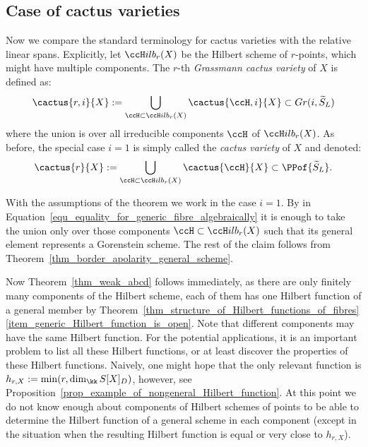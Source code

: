 \documentclass[12pt,a4paper]{article}
\newcommand{\usualHilb}{{\ccH}ilb}
\begin{document}
\subsection{Case of cactus varieties}

Now we compare the standard terminology for cactus varieties with the relative linear spans.
Explicitly, let $\usualHilb_{r}(X)$ be the Hilbert scheme of $r$-points, which might have multiple components.
The $r$-th \emph{Grassmann cactus variety} of $X$ is defined as:
\[
  \cactus{r, i}{X}:= \bigcup_{\ccH \subset \usualHilb_{r}(X)} \cactus{\ccH, i}{X}  \subset Gr(i, \widetilde{S}_L)
\]
where the union is over all irreducible components $\ccH$ of $\usualHilb_{r}(X)$.
As before, the special case $i=1$ is simply called the \emph{cactus variety} of $X$ and denoted:
\begin{equation}
  \label{equ_defin_cactus}
  \cactus{r}{X}:= \bigcup_{\ccH \subset \usualHilb_{r}(X)} \cactus{\ccH}{X}  \subset \PPof{\widetilde{S}_L}.
\end{equation}




\begin{prf}
   With the assumptions of the theorem we work in the case
   $i=1$.
   By \cite[Cor.~6.20]{jabu_jelisiejew_finite_schemes_and_secants}
    in Equation~\ref{equ_equality_for_generic_fibre_algebraically} it is enough to take the union only over those components $\ccH \subset \usualHilb_{r}(X)$ such that its general element represents a Gorenstein scheme.
    The rest of the claim follows from Theorem~\ref{thm_border_apolarity_general_scheme}.
\end{prf}

Now Theorem~\ref{thm_weak_abcd} follows immediately, as there are only finitely many components of the Hilbert scheme, each of them has one Hilbert function of a general member by Theorem~\ref{thm_structure_of_Hilbert_functions_of_fibres}\ref{item_generic_Hilbert_function_is_open}.
Note that different components may have the same Hilbert function.
For the potential applications, it is an important problem to list all these Hilbert functions, or at least discover the properties of these Hilbert functions.
Naively, one might hope that the only relevant function is $h_{r,X}:= \min(r, \dim_{\kk} S[X]_D)$,
however, see Proposition~\ref{prop_example_of_nongeneral_Hilbert_function}.
At this point we do not know enough about components of Hilbert schemes of points to be able to determine the Hilbert function of a general scheme in each component (except in the situation when the resulting Hilbert function is equal or very close to $h_{r,X}$).
\end{document}
